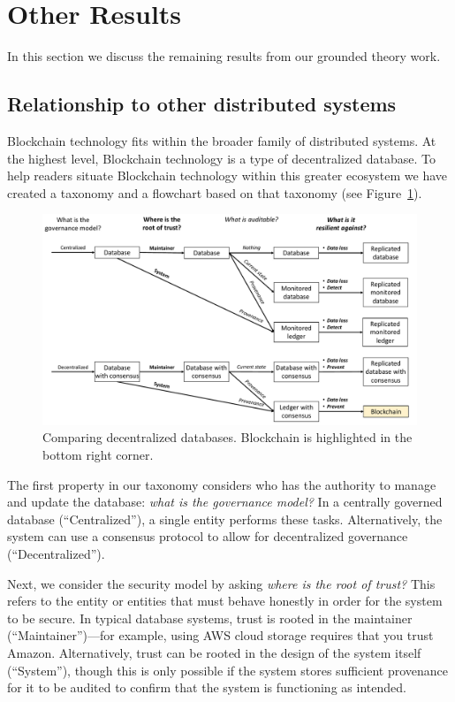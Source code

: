 \section{Other Results}
In this section we discuss the remaining results from our grounded theory work.

\subsection{Relationship to other distributed systems}
\label{sec:distributed-comparison}
Blockchain technology fits within the broader family of distributed systems.
At the highest level, Blockchain technology is a type of decentralized database.
To help readers situate Blockchain technology within this greater ecosystem we have created a taxonomy and a flowchart based on that taxonomy (see Figure~\ref{fig:blockchainFlowchart}).

\begin{figure}
	\centering
	\includegraphics[width=.75\textwidth]{figures/BlockchainFlowchart}
	\caption{Comparing decentralized databases. Blockchain is highlighted in the bottom right corner.}
	\label{fig:blockchainFlowchart}
\end{figure}

The first property in our taxonomy considers who has the authority to manage and update the database: \emph{what is the governance model?} In a centrally governed database (``Centralized''), a single entity performs these tasks. Alternatively, the system can use a consensus protocol to allow for decentralized governance (``Decentralized'').

Next, we consider the security model by asking \emph{where is the root of trust?}
This refers to the entity or entities that must behave honestly in order for the system to be secure.
In typical database systems, trust is rooted in the maintainer (``Maintainer'')---for example, using AWS cloud storage requires that you trust Amazon.
Alternatively, trust can be rooted in the design of the system itself (``System''), though this is only possible if the system stores sufficient provenance for it to be audited to confirm that the system is functioning as intended.

